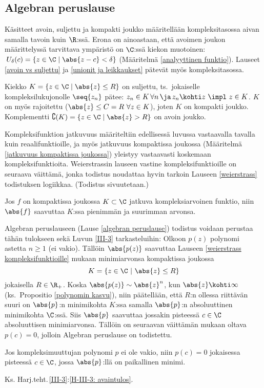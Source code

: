 \subsection*{Algebran peruslause}

Käsitteet avoin, suljettu ja kompakti joukko määritellään kompleksitasossa aivan samalla
tavoin kuin $\R$:ssä. Erona on ainoastaan, että avoimen joukon määrittelyssä tarvittava
ympäristö on $\C$:ssä kiekon muotoinen: $\,U_\delta(c)=\{z\in\C \mid \abs{z-c}<\delta\}$
(Määritelmä \ref{analyyttinen funktio}). Lauseet \ref{avoin vs suljettu} ja
\ref{unionit ja leikkaukset} pätevät myös kompleksitasossa.
\begin{Exa} Kiekko $K=\{z\in\C \mid \abs{z} \le R\}$ on suljettu, ts.\ jokaiselle
kompleksilukujonolle $\seq{z_n}$ pätee: 
$z_n \in K\,\forall n\,\ja\,z_n \kohti z\ \impl\ z \in K$. $K$ on myös rajoitettu
($\abs{z} \le C=R\ \forall z \in K$), joten $K$ on kompakti joukko. Komplementti
$\complement(K)=\{z\in\C \mid \abs{z}>R\}$ on avoin joukko. \loppu
\end{Exa}
Kompleksifunktion jatkuvuus määriteltiin edellisessä luvussa vastaavalla tavalla kuin
reaalifunktioille, ja myös jatkuvuus kompaktissa joukossa (Määritelmä 
\ref{jatkuvuus kompaktissa joukossa}) yleistyy vastaavasti koskemaan kompleksifunktioita.
Weierstrassin lauseen vastine kompleksifunktioille on seuraava väittämä, jonka todistus
noudattaa hyvin tarkoin Lauseen \ref{weierstrass} todistuksen logiikkaa.
(Todistus sivuutetaan.)
\begin{*Lause} \label{weierstrass kompleksifunktioille}
Jos $f$ on kompaktissa joukossa $K\subset\C$ jatkuva kompleksiarvoinen funktio, niin
$\abs{f}$ saavuttaa $K$:ssa pienimmän ja suurimman arvonsa.
\end{*Lause}
Algebran peruslauseen (Lause \ref{algebran peruslause}) todistus voidaan perustaa tähän
tulokseen sekä Luvun \ref{III-3} tarkasteluihin: Olkoon $p(z)$ polynomi astetta $n \ge 1$
(ei vakio). Tällöin $\abs{p(z)}$ saavuttaa Lauseen \ref{weierstrass kompleksifunktioille}
mukaan minimiarvonsa kompaktissa joukossa
\[
K=\{z\in\C \ | \ \abs{z}\leq R\}
\]
jokaisella $R \in \R_+$. Koska $\abs{p(z)} \sim \abs{z}^n$, kun $\abs{z}\kohti\infty$ 
(ks.\ Propositio \ref{polynomin kasvu}), niin päätellään, että $R$:n ollessa riittävän suuri
on $\abs{p}$:n minimikohta $K$:ssa samalla $\abs{p}$:n absoluuttinen minimikohta $\C$:ssä. Siis 
$\abs{p}$ saavuttaa jossakin pisteessä $c \in \C$ absoluuttisen minimiarvonsa. Tällöin on
seuraavan väittämän mukaan oltava $p(c)=0$, jolloin Algebran peruslause on todistettu.
\begin{Lause} \label{polynomitulos} Jos kompleksimuuttujan polynomi $p$ ei ole vakio, niin 
$p(c)=0$ jokaisessa pisteessä $c \in \C$, jossa $\abs{p}$:llä on paikallinen minimi. 
\end{Lause}
\tod Ks. Harj.teht.\,\ref{III-3}:\ref{H-III-3: avaintulos}. \loppu

